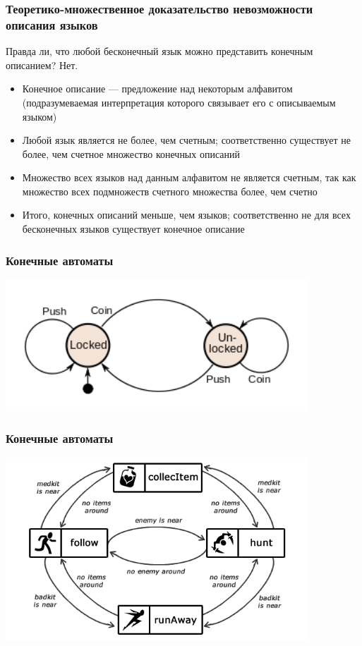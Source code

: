 \documentclass{beamer}
\begin{document}
\begin{frame}[fragile]
  \transwipe[direction=90]
  \frametitle{Теоретико-множественное доказательство невозможности описания языков}
  Правда ли, что любой бесконечный язык можно представить конечным описанием? \pause Нет. 
  
  \begin{itemize}
    \item Конечное описание --- предложение над некоторым алфавитом (подразумеваемая интерпретация которого связывает его с описываемым языком) \pause
    \item Любой язык является не более, чем счетным; соответственно существует не более, чем счетное множество конечных описаний \pause
    \item Множество всех языков над данным алфавитом не является счетным, так как множество всех подмножеств счетного множества более, чем счетно \pause
    \item Итого, конечных описаний меньше, чем языков; соответственно не для всех бесконечных языков существует конечное описание 
  \end{itemize}
\end{frame}

\begin{frame}[fragile]
  \transwipe[direction=90]
  \frametitle{Конечные автоматы}
  \begin{center}
     \includegraphics[width=0.85\textwidth]{pics/auto.png}  
   \end{center}
\end{frame}

\begin{frame}[fragile]
  \transwipe[direction=90]
  \frametitle{Конечные автоматы}
  \begin{center}
     \includegraphics[width=0.85\textwidth]{pics/game.png}  
   \end{center}
\end{frame}
\end{document}
